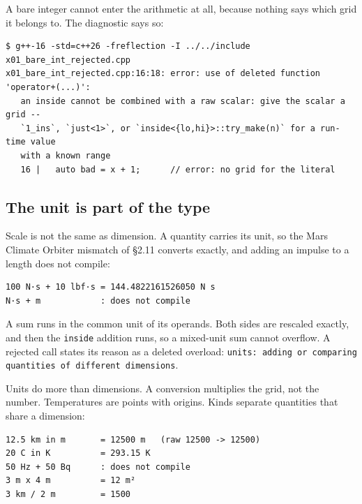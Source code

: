 \documentclass[11pt,a4paper]{article}
\newcommand{\code}[1]{\texttt{\small #1}}
\begin{document}
\noindent
A bare integer cannot enter the arithmetic at all, because nothing says which
grid it belongs to. The diagnostic says so:

\begin{lstlisting}[style=term]
$ g++-16 -std=c++26 -freflection -I ../../include x01_bare_int_rejected.cpp
x01_bare_int_rejected.cpp:16:18: error: use of deleted function 'operator+(...)':
   an inside cannot be combined with a raw scalar: give the scalar a grid --
   `1_ins`, `just<1>`, or `inside<{lo,hi}>::try_make(n)` for a run-time value
   with a known range
   16 |   auto bad = x + 1;      // error: no grid for the literal
\end{lstlisting}

\subsection{The unit is part of the type}\label{sec:units}

Scale is not the same as dimension. A quantity carries its unit, so the Mars
Climate Orbiter mismatch of \S2.11 converts exactly, and adding an impulse to a
length does not compile:


\begin{lstlisting}[style=term]
100 N·s + 10 lbf·s = 144.4822161526050 N s
N·s + m            : does not compile
\end{lstlisting}

\noindent
A sum runs in the common unit of its operands. Both sides are rescaled exactly,
and then the \code{inside} addition runs, so a mixed-unit sum cannot overflow.
A rejected call states its reason as a deleted overload:
\code{units: adding or comparing quantities of different dimensions}.

Units do more than dimensions. A conversion multiplies the grid, not the
number. Temperatures are points with origins. Kinds separate quantities that
share a dimension:


\begin{lstlisting}[style=term]
12.5 km in m       = 12500 m   (raw 12500 -> 12500)
20 C in K          = 293.15 K
50 Hz + 50 Bq      : does not compile
3 m x 4 m          = 12 m²
3 km / 2 m         = 1500
\end{lstlisting}
\end{document}
